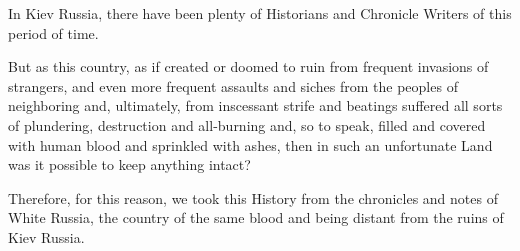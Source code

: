  
 
 
 
 

In Kiev Russia, there have been plenty of Historians and Chronicle Writers of
this period of time.

But as this country, as if created or doomed to ruin from frequent invasions of
strangers, and even more frequent assaults and siches from the peoples of
neighboring and, ultimately, from inscessant strife and beatings suffered all
sorts of plundering, destruction and all-burning and, so to speak, filled and
covered with human blood and sprinkled with ashes, then in such an unfortunate
Land was it possible to keep anything intact?

Therefore, for this reason, we took this History from the chronicles and notes
of White Russia, the country of the same blood and being distant from the ruins
of Kiev Russia.

